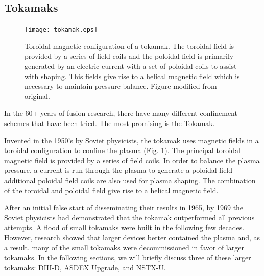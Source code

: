 \subsection{Tokamaks}
\begin{figure}[ht]
    \centering
    \texttt{[image: tokamak.eps]}
    \caption{Toroidal magnetic configuration of a tokamak. The toroidal field is provided by a series of field coils and the poloidal field is primarily generated by an electric current with a set of poloidal coils to assist with shaping. This fields give rise to a helical magnetic field which is necessary to maintain pressure balance. Figure modified from original\cite{geiger2013thesis}.}
    \label{fig:tokamak}
\end{figure}
In the 60+ years of fusion research, there have many different confinement schemes that have been tried. The most promising is the Tokamak.

Invented in the 1950's by Soviet physicists, the tokamak uses magnetic fields in a toroidal configuration to confine the plasma (Fig. \ref{fig:tokamak}). The principal toroidal magnetic field is provided by a series of field coils. In order to balance the plasma pressure, a current is run through the plasma to generate a poloidal field---additional poloidal field coils are also used for plasma shaping. The combination of the toroidal and poloidal field give rise to a helical magnetic field.

After an initial false start of disseminating their results in 1965, by 1969 the Soviet physicists had demonstrated that the tokamak outperformed all previous attempts. A flood of small tokamaks were built in the following few decades. However, research showed that larger devices better contained the plasma and, as a result, many of the small tokamaks were decommissioned in favor of larger tokamaks. In the following sections, we will briefly discuss three of these larger tokamaks: DIII-D, ASDEX Upgrade, and NSTX-U.

